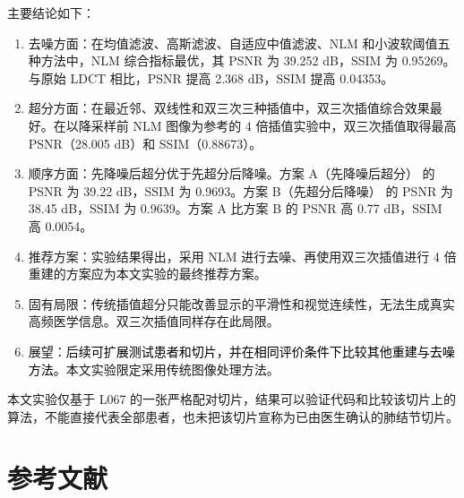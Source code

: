 \documentclass[10.5pt,compsoc,UTF8]{CjC}
\newcommand{\added}[1]{\textcolor{black}{#1}}
\theoremstyle{mystyle}
\begin{document}
主要结论如下：

\begin{enumerate}
\item 去噪方面：在均值滤波、高斯滤波、自适应中值滤波、NLM 和小波软阈值五种方法中，NLM 综合指标最优，其 PSNR 为 39.252 dB，SSIM 为 0.95269。与原始 LDCT 相比，PSNR 提高 2.368 dB，SSIM 提高 0.04353。
\item 超分方面：在最近邻、双线性和双三次三种插值中，双三次插值综合效果最好。在以降采样前 NLM 图像为参考的 4 倍插值实验中，双三次插值取得最高 PSNR（28.005 dB）和 SSIM（0.88673）。
\item 顺序方面：先降噪后超分优于先超分后降噪。方案 A（先降噪后超分） 的 PSNR 为 39.22 dB，SSIM 为 0.9693。方案 B（先超分后降噪） 的 PSNR 为 38.45 dB，SSIM 为 0.9639。方案 A 比方案 B 的 PSNR 高 0.77 dB，SSIM 高 0.0054。
\item 推荐方案：实验结果得出，采用 NLM 进行去噪、再使用双三次插值进行 4 倍重建的方案应为本文实验的最终推荐方案。
\item 固有局限：传统插值超分只能改善显示的平滑性和视觉连续性，无法生成真实高频医学信息。双三次插值同样存在此局限。
\item 展望：\added{后续可扩展测试患者和切片，并在相同评价条件下比较其他重建与去噪方法。}本文实验限定采用传统图像处理方法。
\end{enumerate}

本文实验仅基于 L067 的一张严格配对切片，结果可以验证代码和比较该切片上的算法，不能直接代表全部患者，也未把该切片宣称为已由医生确认的肺结节切片。

\clearpage
\begingroup
\color{black}
\relax
\section*{\heiti 参考文献}


\endgroup

\clearpage
\appendix
\begingroup
\color{black}
\linespread{1.0}\selectfont
{}
\relax
{}\relax
\renewcommand{\theFancyVerbLine}{\textcolor{black}{\scriptsize\arabic{FancyVerbLine}}}

\endgroup
\end{document}
